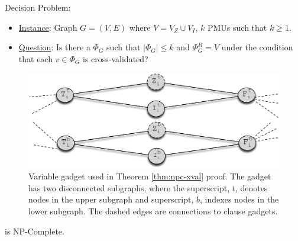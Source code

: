 \xval Decision Problem:
\begin{itemize}
	\item \underline{Instance}: Graph $G=(V,E)$ where $V=V_Z \cup V_I$, $k$ PMUs such that $k \geq 1$.

	\item \underline{Question}: Is there a $\Phi_G$ such that $|\Phi_G| \leq k$ and $\Phi^R_G = V$ under the condition that each $v \in \Phi_G$ is cross-validated?
\end{itemize}


\begin{figure}[t]
\centering
\includegraphics[scale=0.46]{figs/vgadget-inject.pdf}
\caption{Variable gadget used in Theorem \ref{thm:npc-xval} proof.  The gadget has two disconnected subgraphs, where the superscript, $t$, denotes nodes in the upper subgraph and superscript, $b$, indexes
nodes in the lower subgraph. The dashed edges are connections to clause gadgets.}
\label{fig:xval-gadget}
\end{figure}

\begin{theorem}
\xval is NP-Complete. %
\label{thm:npc-xval}
\end{theorem}

